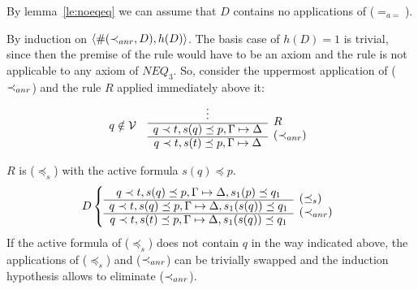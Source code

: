 \begin{PROOF}
By lemma~\ref{le:noeqeq} we can assume that $D$ contains no applications of
($=_{a=}$). 

By induction on $\langle\#(\mathbin{\prec}_{anr},D),h(D)\rangle$.
The basis
case of $h(D)=1$ is trivial, since then the premise of the rule
would have to be an axiom and the rule is not applicable to any axiom of $NEQ_3$.
So, consider the uppermost application of ($\mathbin{\prec}_{anr}$) and the rule $R$ applied
immediately above it:
\[ q\notin \cal V\ \ \ \begin{array}{cl}
  \vdots & \raisebox{-1.2ex}[1.5ex][0ex]{$R$} \\ \cline{1-1}
  q\prec t,s(q)\preceq p,\Gamma\Seq\Delta &
  \raisebox{-1.2ex}[1.5ex][0ex]{($\prec_{anr}$)} \\ \cline{1-1}
  q\prec t,s(t)\preceq p,\Gamma\Seq\Delta &
\end{array} \]
%
\begin{LS}
\item $R$ is ($\preceq_s$) with the active formula $s(q)\preceq p$. 
  \[D \left\{ \begin{array}{cl}
 q\prec t,s(q)\preceq p,\Gamma \Seq \Delta,s_1(p)\preceq q_1  &
  \raisebox{-1.2ex}[1.5ex][0ex]{$(\preceq_s)$} \\ \cline{1-1}
 q\prec t,s(q)\preceq p,\Gamma \Seq \Delta, s_1(s(q))\preceq q_1  &
\raisebox{-1.2ex}[1.5ex][0ex]{$(\prec_{anr})$} \\ \cline{1-1}
 q\prec t,s(t)\preceq p,\Gamma \Seq\Delta, s_1(s(q))\preceq q_1
\end{array} \right. \]
If the active formula of ($\preceq_s$) does not contain $q$ in the way 
indicated above, the applications of ($\preceq_s$) and ($\mathbin{\prec}_{anr}$) can be
trivially swapped and the induction hypothesis allows to eliminate 
($\mathbin{\prec}_{anr}$). 


\end{LS}
\end{PROOF}
